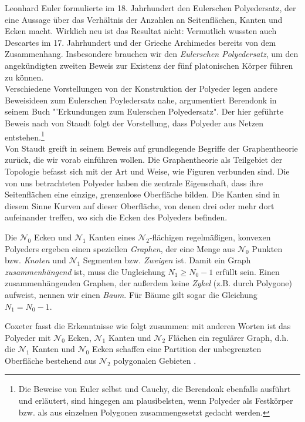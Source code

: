 Leonhard Euler formulierte im 18. Jahrhundert den Eulerschen Polyedersatz, der eine Aussage über das Verhältnis der Anzahlen an Seitenflächen, Kanten und Ecken macht. Wirklich neu ist das Resultat nicht: Vermutlich wussten auch Descartes im 17. Jahrhundert und der Grieche Archimedes bereits von dem Zusammenhang. Insbesondere brauchen wir den \textit{Eulerschen Polyedersatz}, um den angekündigten zweiten Beweis zur Existenz der fünf platonischen Körper führen zu können.\\
Verschiedene Vorstellungen von der Konstruktion der Polyeder legen andere Beweisideen zum Eulerschen Poyledersatz nahe, argumentiert Berendonk in seinem Buch "'Erkundungen zum Eulerschen Polyedersatz". \citep[vgl.][39]{Berendonk2014} Der hier geführte Beweis nach von Staudt folgt der Vorstellung, dass Polyeder aus Netzen entstehen.\footnote{Die Beweise von Euler selbst und Cauchy, die Berendonk ebenfalls ausführt und erläutert, sind hingegen am plausibelsten, wenn Polyeder als Festkörper bzw. als aus einzelnen Polygonen zusammengesetzt gedacht werden.}\\
Von Staudt greift in seinem Beweis auf grundlegende Begriffe der Graphentheorie zurück, die wir vorab einführen wollen. Die Graphentheorie als Teilgebiet der Topologie befasst sich mit der Art und Weise, wie Figuren verbunden sind. Die von uns betrachteten Polyeder haben die zentrale Eigenschaft, dass ihre Seitenflächen eine einzige, grenzenlose Oberfläche bilden. Die Kanten sind in diesem Sinne Kurven auf dieser Oberfläche, von denen drei oder mehr dort aufeinander treffen, wo sich die Ecken des Polyeders befinden. 
\begin{bem} 
Die $\mathcal{N}_0$ Ecken und $\mathcal{N}_1$ Kanten eines $\mathcal{N}_2$-flächigen regelmäßigen, konvexen Polyeders ergeben einen speziellen \textit{Graphen}, der eine Menge aus $\mathcal{N}_0$ Punkten bzw. \textit{Knoten} und $\mathcal{N}_1$ Segmenten bzw. \textit{Zweigen} ist. Damit ein Graph \textit{zusammenhängend} ist, muss die Ungleichung $N_{1} \geq N_{0}-1$ erfüllt sein. 
Einen zusammenhängenden Graphen, der außerdem keine \textit{Zykel} (z.B. durch Polygone) aufweist, nennen wir einen \textit{Baum}. Für Bäume gilt sogar die Gleichung $N_{1} = N_{0}-1$. 
\end{bem}
Coxeter fasst die Erkenntnisse wie folgt zusammen: mit anderen Worten ist das Polyeder mit $\mathcal{N}_0$ Ecken, $\mathcal{N}_1$ Kanten und $\mathcal{N}_2$ Flächen ein regulärer Graph, d.h. die $\mathcal{N}_1$ Kanten und $\mathcal{N}_0$ Ecken schaffen eine Partition der unbegrenzten Oberfläche bestehend aus $\mathcal{N}_2$ polygonalen Gebieten \citep[6]{Coxeter1973}.\\
